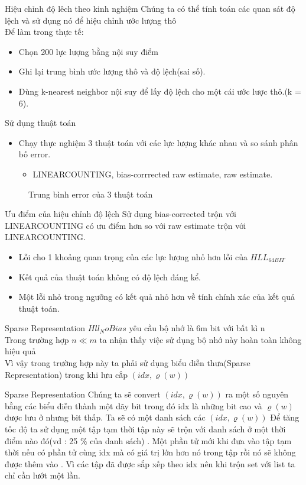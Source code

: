 \documentclass{beamer}
\newcommand{\bi}{\begin{itemize}}
\newcommand{\ei}{\end{itemize}}
\begin{document}
\begin{frame}{Hiệu chỉnh độ lêch theo kinh nghiệm}
Chúng ta có thể tính toán các quan sát độ lệch và sử dụng nó để hiệu chỉnh ước lượng thô \\ 

Để làm trong thực tế:
\bi
\item Chọn 200 lực lượng bằng nội suy điểm
\item Ghi lại trung bình ước lượng thô và độ lệch(sai số).
\item Dùng k-nearest neighbor nội suy để lấy độ lệch cho một cái ước lược thô.(k = 6).
\ei
\end{frame}
\begin{frame}{Sử dụng thuật toán}
\begin{itemize}
\item Chạy thực nghiệm 3 thuật toán với các lực lượng khác nhau và so sánh phân bố error.
\bi
\item LINEARCOUNTING, bias-corrrected raw estimate, raw estimate.
\ei
\end{itemize}
\begin{figure}[h]
\caption{Trung bình error của 3 thuật toán}
\end{figure}
\end{frame}
\begin{frame}{Ưu điểm của hiệu chỉnh độ lệch}
Sử dụng bias-corrected trộn với LINEARCOUNTING có ưu điểm hơn so với raw estimate trộn với LINEARCOUNTING.
\begin{itemize}
\item Lỗi cho 1 khoảng quan trọng của các lực lượng nhỏ hơn lỗi của $HLL_{64BIT}$
\item Kết quả của thuật toán không có độ lệch đáng kể.
\item Một lỗi nhỏ trong ngưỡng có kết quả nhỏ hơn về tính chính xác của kết quả thuật toán. 
\end{itemize} 
\end{frame}
\begin{frame}{Sparse Representation}
$Hll_NoBias $ yêu cầu bộ nhớ là 6m bit với bất kì n  \\
Trong trường hợp $n\ll m $ ta nhận thấy việc sử dụng bộ nhớ này hoàn toàn không hiệu quả \\
Vì vậy trong trường hợp này ta  phải sử dụng biểu diễn thưa(Sparse Representation) trong khi lưu cắp $(idx,\varrho(w)) $ \\
\end{frame}
\begin{frame}{Sparse Representation}
Chúng ta sẽ convert $(idx,\varrho(w)) $ ra một số nguyên bằng các biểu điễn thành một dãy bit trong đó idx là những bit cao và $\varrho(w) $ được lưu ở nhưng bit thấp. 
Ta sẽ có một danh sách các $(idx,\varrho(w)) $ 
Để tăng tốc độ ta sử dụng một tập tạm thời tập này sẽ trộn với danh sách ở một thời điểm nào đó(vd : 25 $\%$ của danh sách) .
Một phần tử mới khi đưa vào  tập tạm thời nếu có phần tử cùng idx mà có giá trị lớn hơn nó trong tập rồi nó sẽ không được thêm vào .
Vì các tập đã được sắp xếp theo idx nên khi trộn set với list ta chỉ cần lướt một lần.

\end{frame}
\end{document}
